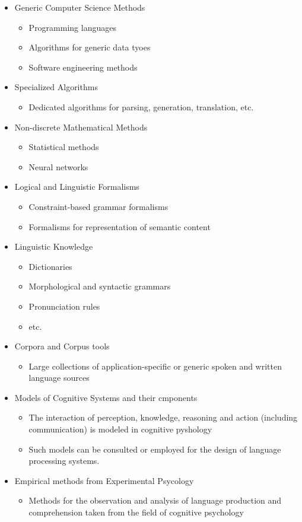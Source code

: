 \documentclass[11pt]{article}
\begin{document}
\begin{itemize}
 \item Generic Computer Science Methods
\begin{itemize}
 \item Programming languages
 \item Algorithms for generic data tyoes
 \item Software engineering methods
\end{itemize}
 \item Specialized Algorithms
\begin{itemize}
 \item Dedicated algorithms for parsing, generation, translation, etc.
\end{itemize}
 \item Non-discrete Mathematical Methods
\begin{itemize}
 \item Statistical methods
 \item Neural networks
\end{itemize}
 \item Logical and Linguistic Formalisms
\begin{itemize}
 \item Constraint-based grammar formalisms
 \item Formalisms for representation of semantic content
\end{itemize}
 \item Linguistic Knowledge
\begin{itemize}
 \item Dictionaries
 \item Morphological and syntactic grammars
 \item Pronunciation rules
 \item etc.
\end{itemize}
 \item Corpora and Corpus tools
\begin{itemize}
 \item Large collections of application-specific or generic spoken and written language sources
\end{itemize}
 \item Models of Cognitive Systems and their cmponents
\begin{itemize}
 \item The interaction of perception, knowledge, reasoning and action (including communication) is modeled in cognitive pyshology
 \item Such models can be consulted or employed for the design of language processing systems.
\end{itemize}
 \item Empirical methods from Experimental Psycology
\begin{itemize}
 \item Methods for the observation and analysis of language production and comprehension taken from the field of cognitive psychology
\end{itemize}
\end{itemize}
\end{document}
